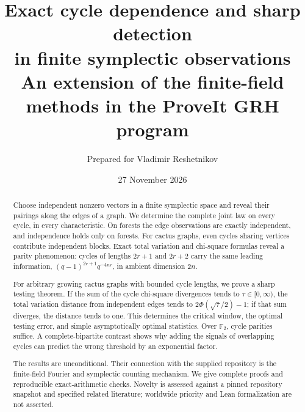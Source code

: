 \documentclass[11pt]{article}
\title{\textbf{Exact cycle dependence and sharp detection\\in finite symplectic observations}\\[5pt]
\large An extension of the finite-field methods in the ProveIt GRH program}
\author{Prepared for Vladimir Reshetnikov}
\date{27 November 2026}
\theoremstyle{definition}\newtheorem{definition}[theorem]{Definition}
\theoremstyle{remark}\newtheorem{remark}[theorem]{Remark}
\newcommand{\F}{\mathbb F}
\begin{document}
\maketitle
\begin{abstract}
Choose independent nonzero vectors in a finite symplectic space and reveal their
pairings along the edges of a graph. We determine the complete joint law on every
cycle, in every characteristic. On forests the edge observations are exactly
independent, and independence holds only on forests. For cactus graphs, even cycles
sharing vertices contribute independent blocks. Exact total variation and
chi-square formulas reveal a parity phenomenon: cycles of lengths $2r+1$ and
$2r+2$ carry the same leading information,
$(q-1)^{2r+1}q^{-4nr}$, in ambient dimension $2n$.

For arbitrary growing cactus graphs with bounded cycle lengths, we prove a sharp
testing theorem. If the sum of the cycle chi-square divergences tends to
$\tau\in[0,\infty)$, the total variation distance from independent edges tends to
$2\Phi(\sqrt{\tau}/2)-1$; if that sum diverges, the distance tends to one.
This determines the critical window, the optimal testing error, and simple
asymptotically optimal statistics. Over $\F_2$, cycle parities suffice. A
complete-bipartite contrast shows why adding the signals of overlapping cycles
can predict the wrong threshold by an exponential factor.

The results are unconditional. Their connection with the supplied repository is
the finite-field Fourier and symplectic counting mechanism. We give complete
proofs and reproducible exact-arithmetic checks. Novelty is assessed against a
pinned repository snapshot and specified related literature; worldwide priority
and Lean formalization are not asserted.
\end{abstract}
\tableofcontents




\appendix


\end{document}
